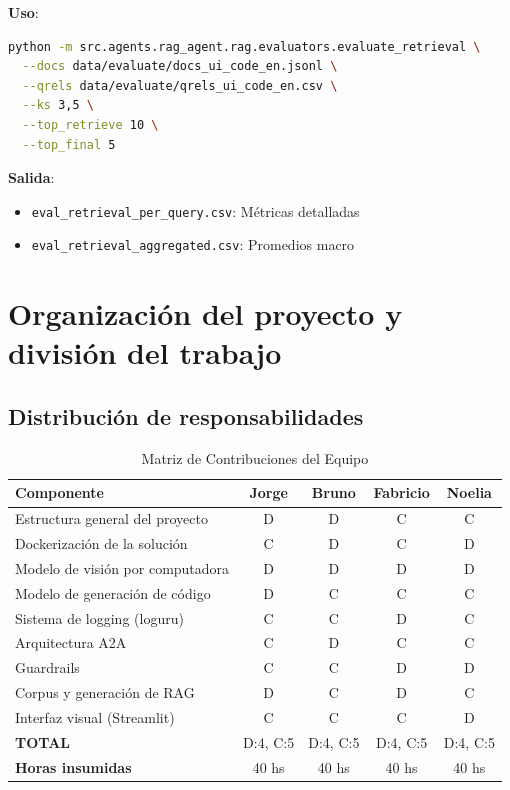\documentclass[12pt,a4paper]{article}
\begin{document}
\textbf{Uso}:
\begin{lstlisting}[language=bash,caption={Ejecucion de Evaluacion}]
python -m src.agents.rag_agent.rag.evaluators.evaluate_retrieval \
  --docs data/evaluate/docs_ui_code_en.jsonl \
  --qrels data/evaluate/qrels_ui_code_en.csv \
  --ks 3,5 \
  --top_retrieve 10 \
  --top_final 5
\end{lstlisting}

\textbf{Salida}:
\begin{itemize}
    \item \texttt{eval\_retrieval\_per\_query.csv}: Métricas detalladas
    \item \texttt{eval\_retrieval\_aggregated.csv}: Promedios macro
\end{itemize}

\section{Organización del proyecto y división del trabajo}

\subsection{Distribución de responsabilidades}

\begin{table}[H]
\centering
\caption{Matriz de Contribuciones del Equipo}
\begin{tabular}{lcccc}
\toprule
\textbf{Componente} & \textbf{Jorge} & \textbf{Bruno} & \textbf{Fabricio} & \textbf{Noelia} \\
\midrule
Estructura general del proyecto & D & D & C & C \\
Dockerización de la solución & C & D & C & D \\
Modelo de visión por computadora & D & D & D & D \\
Modelo de generación de código & D & C & C & C \\
Sistema de logging (loguru) & C & C & D & C \\
Arquitectura A2A & C & D & C & C \\
Guardrails & C & C & D & D \\
Corpus y generación de RAG & D & C & D & C \\
Interfaz visual (Streamlit) & C & C & C & D \\
\midrule
\textbf{TOTAL} & D:4, C:5 & D:4, C:5 & D:4, C:5 & D:4, C:5 \\
\textbf{Horas insumidas} & 40 hs & 40 hs & 40 hs & 40 hs \\
\bottomrule
\end{tabular}
\end{table}
\end{document}
